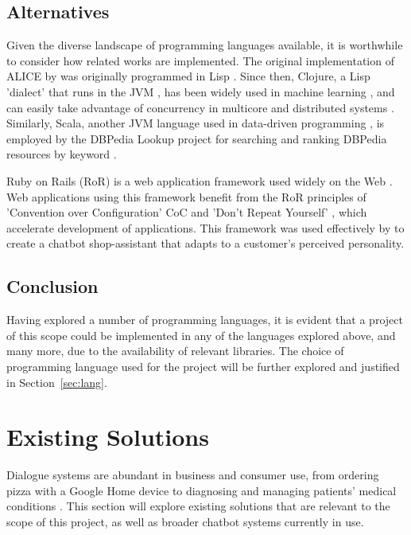 \subsection{Alternatives}
Given the diverse landscape of programming languages available, it is worthwhile to consider how related works are implemented. The original implementation of ALICE by \citet{wallace2009anatomy} was originally programmed in Lisp \cite{winston1986lisp}. Since then, Clojure, a Lisp 'dialect' that runs in the JVM \cite{hickey2008clojure}, has been widely used in machine learning \cite{wali2014clojure}, and can easily take advantage of concurrency in multicore and distributed systems \cite{emerick2012clojure}. Similarly, Scala, another JVM language used in data-driven programming \cite{wampler2014programming}, is employed by the DBPedia Lookup project for searching and ranking DBPedia resources by keyword \cite{dbpedialookup}.

Ruby on Rails (RoR) is a web application framework used widely on the Web \cite{paplauskaite2016}. Web applications using this framework benefit from the RoR principles of 'Convention over Configuration' CoC and 'Don't Repeat Yourself' \cite{bachle2007ruby}, which accelerate development of applications. This framework was used effectively by \citet{horzyk2009intelligent} to create a chatbot shop-assistant that adapts to a customer's perceived personality.

\subsection{Conclusion}
Having explored a number of programming languages, it is evident that a project of this scope could be implemented in any of the languages explored above, and many more, due to the availability of relevant libraries. The choice of programming language used for the project will be further explored and justified in Section~\ref{sec:lang}.

\cleardoublepage
\section{Existing Solutions}
\label{sec:existing}
Dialogue systems are abundant in business and consumer use, from ordering pizza with a Google Home device \cite{google2018dominos} to diagnosing and managing patients’ medical conditions \cite{yourmd2017}. This section will explore existing solutions that are relevant to the scope of this project, as well as broader chatbot systems currently in use.

